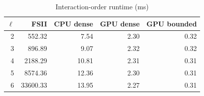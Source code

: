 \begin{table}[htbp]
\centering
\caption{Interaction-order runtime (ms)}
\begin{tabular}{rrrrr}
\toprule
\(\ell\) & FSII & CPU dense & GPU dense & GPU bounded \\
\midrule
2 & 552.32 & 7.54 & 2.30 & 0.32 \\
3 & 896.89 & 9.07 & 2.32 & 0.32 \\
4 & 2188.29 & 10.81 & 2.31 & 0.31 \\
5 & 8574.36 & 12.36 & 2.30 & 0.31 \\
6 & 33600.33 & 13.95 & 2.27 & 0.31 \\
\bottomrule
\end{tabular}
\end{table}
